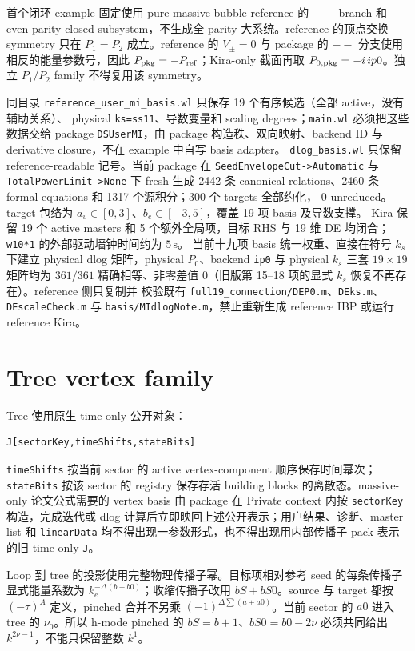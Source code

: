 ﻿\documentclass[a4paper,11pt]{article}
\begin{document}
首个闭环 example 固定使用 pure massive bubble reference 的 $--$ branch 和 even-parity closed subsystem，不生成全 parity 大系统。reference 的顶点交换 symmetry 只在 $P_1=P_2$ 成立。reference 的 $V_{\pm}=0$ 与 package 的 $--$ 分支使用相反的能量参数号，因此 $P_{\rm pkg}=-P_{\rm ref}$；Kira-only 截面再取 $P_{0,\rm pkg}=-i\,ip0$。独立 $P_1/P_2$ family 不得复用该 symmetry。

同目录 \texttt{reference\_user\_mi\_basis.wl} 只保存 19 个有序候选（全部 active，没有辅助关系）、
physical \texttt{ks=ss11}、导数变量和 scaling degrees；\texttt{main.wl} 必须把这些数据交给 package \texttt{DSUserMI}，由 package 构造秩、双向映射、backend ID 与 derivative closure，不在 example 中自写 basis adapter。
\texttt{dlog\_basis.wl} 只保留 reference-readable 记号。当前 package 在
\texttt{SeedEnvelopeCut->Automatic} 与 \texttt{TotalPowerLimit->None} 下 fresh 生成
2442 条 canonical relations、2460 条 formal equations 和 1317 个源积分；300 个 targets 全部约化，
0 unreduced。target 包络为 $a_v\in[0,3]$、$b_e\in[-3,5]$，覆盖 19 项 basis 及导数支撑。
Kira 保留 19 个 active masters 和 5 个额外全局项，目标 RHS 与 19 维 DE 均闭合；
\texttt{w10*1} 的外部驱动墙钟时间约为 $5\,\mathrm{s}$。
当前十九项 basis 统一权重、直接在符号 $k_s$ 下建立 physical dlog 矩阵，physical $P_0$、backend \texttt{ip0}
与 physical $k_s$ 三套 $19\times19$ 矩阵均为 $361/361$ 精确相等、非零差值 0（旧版第 15--18 项的显式 $k_s$ 恢复不再存在）。reference 侧只复制并
校验既有 \texttt{full19\_connection/DEP0.m}、\texttt{DEks.m}、\texttt{DEscaleCheck.m} 与 \texttt{basis/MIdlogNote.m}，禁止重新生成
reference IBP 或运行 reference Kira。

\section{Tree vertex family}

Tree 使用原生 time-only 公开对象：
\begin{verbatim}
J[sectorKey,timeShifts,stateBits]
\end{verbatim}
\texttt{timeShifts} 按当前 sector 的 active vertex-component 顺序保存时间幂次；\texttt{stateBits} 按该 sector 的 registry 保存存活 building blocks 的离散态。massive-only 论文公式需要的 vertex basis 由 package 在 Private context 内按 \texttt{sectorKey} 构造，完成迭代或 dlog 计算后立即映回上述公开表示；用户结果、诊断、master list 和 \texttt{linearData} 均不得出现一参数形式，也不得出现用内部传播子 pack 表示的旧 time-only \texttt{J}。

Loop 到 tree 的投影使用完整物理传播子幂。目标项相对参考 seed 的每条传播子显式能量系数为 $k_e^{-\Delta(b+b0)}$；收缩传播子改用 $bS+bS0$。source 与 target 都按 $(-\tau)^A$ 定义，pinched 合并不另乘 $(-1)^{\Delta\sum(a+a0)}$。当前 sector 的 $a0$ 进入 tree 的 $\nu_0$。所以 h-mode pinched 的 $bS=b+1$、$bS0=b0-2\nu$ 必须共同给出 $k^{2\nu-1}$，不能只保留整数 $k^{1}$。
\end{document}
